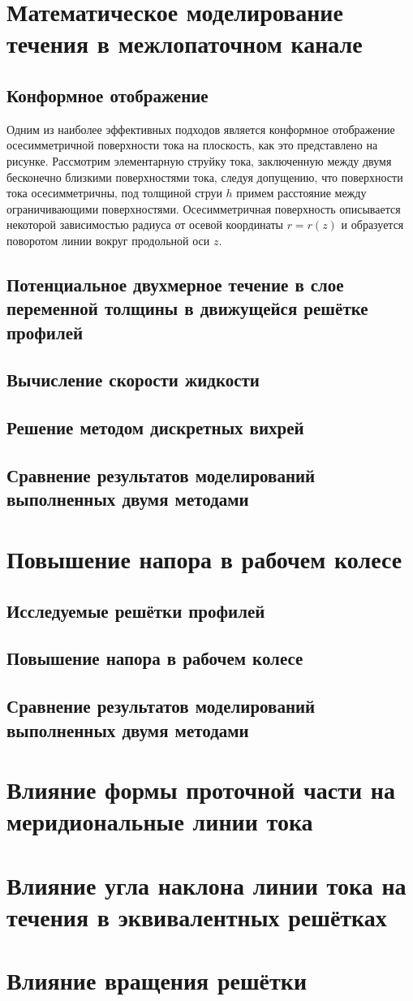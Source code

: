 \section{Математическое моделирование течения в межлопаточном канале}

	\subsection{Конформное отображение}

Одним из наиболее эффективных подходов является конформное отображение осесимметричной поверхности тока на плоскость, как это представлено на рисунке.
Рассмотрим элементарную струйку тока, заключенную между двумя бесконечно близкими поверхностями тока, следуя допущению, что поверхности тока осесимметричны, под толщиной струи \(h\) примем расстояние между ограничивающими поверхностями. Осесимметричная поверхность описывается некоторой зависимостью радиуса от осевой координаты \(r=r(z)\) и образуется поворотом линии вокруг продольной оси \(z\).

	\subsection{Потенциальное двухмерное течение в слое переменной толщины в движущейся решётке профилей}
	\subsection{Вычисление скорости жидкости}
	\subsection{Решение методом дискретных вихрей}
	\subsection{Сравнение результатов моделирований выполненных двумя методами}

\section{Повышение напора в рабочем колесе}
	\subsection{Исследуемые решётки профилей}
	\subsection{Повышение напора в рабочем колесе}
	\subsection{Сравнение результатов моделирований выполненных двумя методами}
	
\section{Влияние формы проточной части на меридиональные линии тока}
\section{Влияние угла наклона линии тока на течения в эквивалентных решётках}
\section{Влияние вращения решётки}

\FloatBarrier
